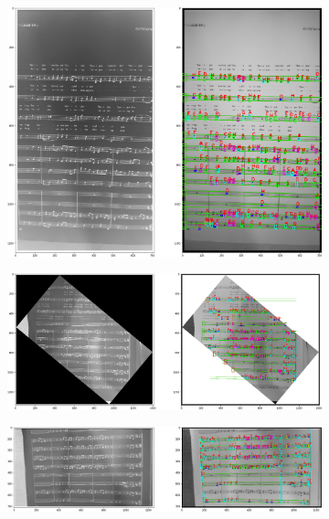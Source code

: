\documentclass[12pt]{article}
\begin{document}
\begin{enumerate}
			\begin{figure}[h!]
				\centering
				\begin{subfigure}[b]{0.48\linewidth}
					\includegraphics[width=\linewidth]{Medium/Zdj20.png}
				\end{subfigure}
				\begin{subfigure}[b]{0.48\linewidth}
					\includegraphics[width=\linewidth]{Medium/Zdj21.png}
				\end{subfigure}
				\begin{subfigure}[b]{0.48\linewidth}
					\includegraphics[width=\linewidth]{Medium/Zdj22.png}
				\end{subfigure}

\end{figure}
\end{enumerate}
\end{document}
